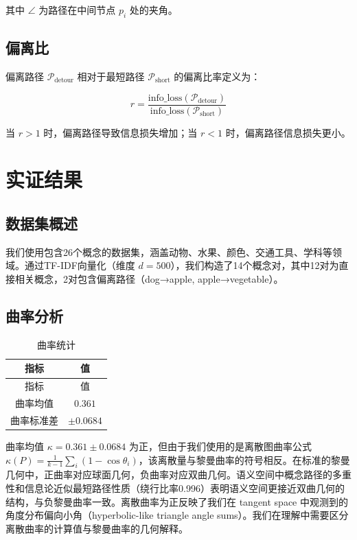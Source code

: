 \documentclass[UTF8,fontset=mac]{ctexart}
\begin{document}
其中 \(\angle\) 为路径在中间节点 \(p_i\) 处的夹角。

\subsection{偏离比}\label{detour-ratio}

偏离路径 \(\mathcal{P}_{\text{detour}}\) 相对于最短路径 \(\mathcal{P}_{\text{short}}\) 的偏离比率定义为：

\begin{equation}
r = \frac{\text{info\_loss}(\mathcal{P}_{\text{detour}})}{\text{info\_loss}(\mathcal{P}_{\text{short}})}
\end{equation}

当 \(r > 1\) 时，偏离路径导致信息损失增加；当 \(r < 1\) 时，偏离路径信息损失更小。

\section{实证结果}\label{results}

\subsection{数据集概述}\label{dataset}

我们使用包含26个概念的数据集，涵盖动物、水果、颜色、交通工具、学科等领域。通过TF-IDF向量化（维度 \(d=500\)），我们构造了14个概念对，其中12对为直接相关概念，2对包含偏离路径（dog→apple, apple→vegetable）。

\subsection{曲率分析}\label{curvature-results}

\begin{longtable}[]{@{}cc@{}}
\caption{曲率统计}\tabularnewline
\toprule\noalign{}
指标 & 值 \\
\midrule\noalign{}
\endfirsthead
\toprule\noalign{}
指标 & 值 \\
\midrule\noalign{}
\endhead
\bottomrule\noalign{}
\endlastfoot
曲率均值 & \(0.361\) \\
曲率标准差 & \(\pm 0.0684\) \\
\end{longtable}

曲率均值 \(\kappa = 0.361 \pm 0.0684\) 为正，但由于我们使用的是离散图曲率公式 \(\kappa(P) = \frac{1}{k-1}\sum_i(1-\cos\theta_i)\)，该离散量与黎曼曲率的符号相反。在标准的黎曼几何中，正曲率对应球面几何，负曲率对应双曲几何。语义空间中概念路径的多重性和信息论近似最短路径性质（绕行比率0.996）表明语义空间更接近双曲几何的结构，与负黎曼曲率一致。离散曲率为正反映了我们在 tangent space 中观测到的角度分布偏向小角（hyperbolic-like triangle angle sums）。我们在理解中需要区分离散曲率的计算值与黎曼曲率的几何解释。
\end{document}
